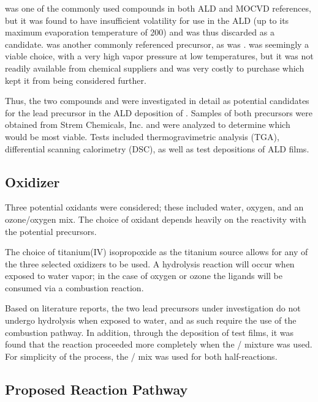  was one of the commonly used compounds in both ALD and MOCVD references, but it was found to have insufficient volatility for use in the ALD (up to its maximum evaporation temperature of 200\degC{})\cite{harjuoja_2006} and was thus discarded as a candidate. \TMHD{} was another commonly referenced precursor\cite{watanabe_growth_2007}, as was \HFAc{}.\cite{Igumenov_1998}  was seemingly a viable choice, with a very high vapor pressure at low temperatures,\cite{Hwang_2007} but it was not readily available from chemical suppliers and was very costly to purchase which kept it from being considered further. 

Thus, the two compounds \HFAc{} and \TMHD{} were investigated in detail as potential candidates for the lead precursor in the ALD deposition of \PTO{}. Samples of both precursors were obtained from Strem Chemicals, Inc.\cite{strem_inc} and were analyzed to determine which would be most viable. Tests included thermogravimetric analysis (TGA), differential scanning calorimetry (DSC), as well as test depositions of ALD films. 


\subsection{Oxidizer}

Three potential oxidants were considered; these included water, oxygen, and an ozone/oxygen mix. The choice of oxidant depends heavily on the reactivity with the potential precursors. 

The choice of titanium(IV) isopropoxide as the titanium source allows for any of the three selected oxidizers to be used. A hydrolysis reaction will occur when exposed to water vapor; in the case of oxygen or ozone the ligands will be consumed via a combustion reaction.\cite{ALD-Handbook,Leskela_2002,lim_atomic_2003}

Based on literature reports, the two lead precursors under investigation do not undergo hydrolysis when exposed to water, and as such require the use of the combustion pathway. In addition, through the deposition of test films, it was found that the reaction proceeded more completely when the / mixture was used. For simplicity of the process, the / mix was used for both half-reactions.\cite{KeunKim2005103}



\subsection{Proposed Reaction Pathway}


